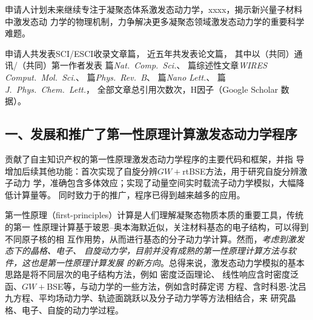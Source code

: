 申请人计划未来继续专注于凝聚态体系激发态动力学，xxxx，揭示新兴量子材料中激发态动
力学的物理机制，力争解决更多凝聚态领域激发态动力学的重要科学难题。


申请人共发表SCI/ESCI收录文章篇，%
{
  近五年共发表论文篇，
  其中以（共同）通讯/（共同）第一作者发表
  篇{\itshape Nat.\ Comp.\ Sci.}、
  篇综述性文章{\itshape WIRES Comput.\ Mol.\ Sci.}、
  篇{\itshape Phys.\ Rev.\ B}、
  篇{\itshape Nano Lett.}、
  篇{\itshape J.\ Phys.\ Chem.\ Lett.}，
  全部文章总引用次数次，H因子（Google Scholar 数据）。
}

\subsection*{一、发展和推广了第一性原理计算激发态动力学程序\hnamd{}}

\begin{center}
  \begin{InnovationBox}
    贡献了自主知识产权的第一性原理激发态动力学程序\hnamd{}的主要代码和框架，并指
    导增加后续其他功能：首次实现了自旋分辨$GW+{}$rtBSE方法，用于研究自旋分辨激子动力
    学，准确包含多体效应；实现了动量空间实时载流子动力学模拟，大幅降低计算量等。
    同时致力于\hnamd{}的推广，程序已得到越来越多的应用。
  \end{InnovationBox}
\end{center}


第一性原理（first-principles）计算是人们理解凝聚态物质本质的重要工具，传统的第一
性原理计算基于玻恩--奥本海默近似，关注材料基态的电子结构，可以得到不同原子核的相
互作用势，从而进行基态的分子动力学计算。然而，\emph{考虑到激发态下的晶格、电子、
  自旋动力学，目前并没有成熟的第一性原理计算方法与软件，这也是第一性原理计算发展
  的新方向}。总得来说，激发态动力学模拟的基本思路是将不同层次的电子结构方法，例如
密度泛函理论、 线性响应含时密度泛函、$GW+{}$BSE等，与动力学的一些方法，例如含时薛定谔
方程、含时科恩-沈吕九方程、平均场动力学、轨迹面跳跃以及分子动力学等方法相结合，来
研究晶格、电子、自旋的动力学过程。

